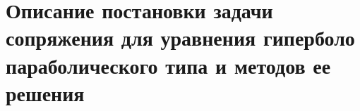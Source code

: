 \newpage

\section{Описание постановки задачи сопряжения для уравнения гиперболо параболического типа и методов ее решения}



